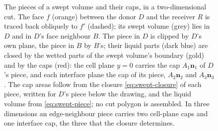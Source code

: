 \begin{figure}[htbp]
\caption{The pieces of a swept volume and their caps, in a two-dimensional cut. The face $f$ (orange) between the donor $D$ and the receiver $R$ is traced back obliquely to $f'$ (dashed); its swept volume (grey) lies in $D$ and in $D$'s face neighbour $B$. The piece in $D$ is clipped by $D$'s own plane, the piece in $B$ by $B$'s; their liquid parts (dark blue) are closed by the wetted parts of the swept volume's boundary (gold) and by the caps (red): the cell plane $y = 0$ carries the cap $A_1\mathbf{n}_1$ of $D$'s piece, and each interface plane the cap of its piece, $A_2\mathbf{n}_2$ and $A_3\mathbf{n}_3$. The cap areas follow from the closure \cref{eq:swept-closure} of each piece, written for $D$'s piece below the drawing, and the liquid volume from \cref{eq:swept-piece}; no cut polygon is assembled. In three dimensions an edge-neighbour piece carries two cell-plane caps and one interface cap, the three that the closure determines.}
\label{fig:pieces}
\end{figure}
